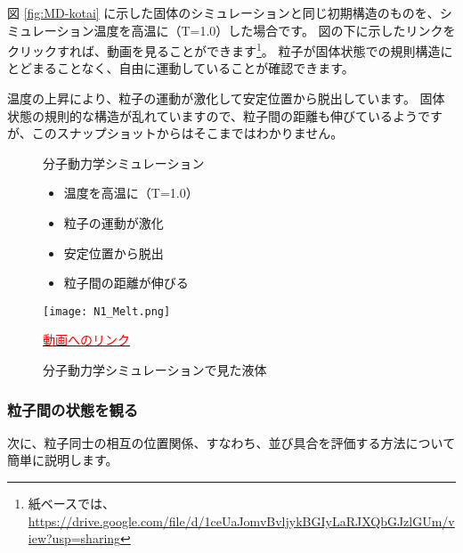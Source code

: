 \documentclass[uplatex,dvipdfmx,a4paper,11pt]{jsarticle}
\begin{document}
図 \ref{fig:MD-kotai} に示した固体のシミュレーションと同じ初期構造のものを、シミュレーション温度を高温に（T=1.0）した場合です。
図の下に示したリンクをクリックすれば、動画を見ることができます\footnote{
	紙ベースでは、\url{https://drive.google.com/file/d/1ceUaJomvBvljykBGIyLaRJXQbGJzlGUm/view?usp=sharing}
}。
粒子が固体状態での規則構造にとどまることなく、自由に運動していることが確認できます。

温度の上昇により、粒子の運動が激化して安定位置から脱出しています。
固体状態の規則的な構造が乱れていますので、粒子間の距離も伸びているようですが、このスナップショットからはそこまではわかりません。
\begin{figure}[htb]
	\begin{center}
		\begin{minipage}{0.4\textwidth}
			\large
			\begin{itembox}[l]{分子動力学シミュレーション}
				\begin{itemize}
					\item 温度を高温に（T=1.0）
					\item 粒子の運動が激化
					\item 安定位置から脱出
					\item 粒子間の距離が伸びる
				\end{itemize}
			\end{itembox}
		\end{minipage}
		\begin{minipage}{0.5\textwidth}
			\begin{center}
				\texttt{[image: N1\_Melt.png]}

				\href{https://drive.google.com/file/d/1ceUaJomvBvljykBGIyLaRJXQbGJzlGUm/view?usp=sharing}{\textcolor{red}{動画へのリンク}}
			\end{center}
		\end{minipage}
		\caption{分子動力学シミュレーションで見た液体}
		\label{fig:MD-ekitai}
	\end{center}
\end{figure}

\subsubsection{粒子間の状態を観る}
次に、粒子同士の相互の位置関係、すなわち、並び具合を評価する方法について簡単に説明します。
\end{document}
